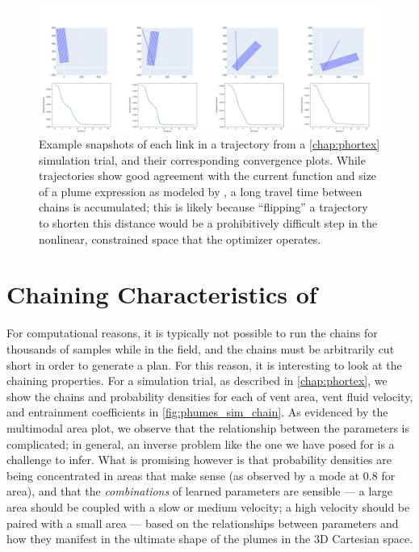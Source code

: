 \begin{figure}[h!]
    \centering
    \includegraphics[width=1\columnwidth]{figures/phortex_iterations.png}
    \caption[\PHORTEX optimization performance]{Example snapshots of each link in a \PHORTEX trajectory from a \cref{chap:phortex} simulation trial, and their corresponding convergence plots. While trajectories show good agreement with the current function and size of a plume expression as modeled by \PHUMES, a long travel time between chains is accumulated; this is likely because ``flipping'' a trajectory to shorten this distance would be a prohibitively difficult step in the nonlinear, constrained space that the optimizer operates.}
    \label{fig:phortex_chain}
\end{figure}

\section{Chaining Characteristics of \PHUMES}
For computational reasons, it is typically not possible to run the chains for thousands of samples while in the field, and the chains must be arbitrarily cut short in order to generate a plan. For this reason, it is interesting to look at the chaining properties. For a simulation trial, as described in \cref{chap:phortex}, we show the chains and probability densities for each of vent area, vent fluid velocity, and entrainment coefficients in \cref{fig:phumes_sim_chain}. As evidenced by the multimodal area plot, we observe that the relationship between the parameters is complicated; in general, an inverse problem like the one we have posed for \PHUMES is a challenge to infer. What is promising however is that probability densities are being concentrated in areas that make sense (as observed by a mode at 0.8 for area), and that the \emph{combinations} of learned parameters are sensible --- a large area should be coupled with a slow or medium velocity; a high velocity should be paired with a small area --- based on the relationships between parameters and how they manifest in the ultimate shape of the plumes in the 3D Cartesian space.

